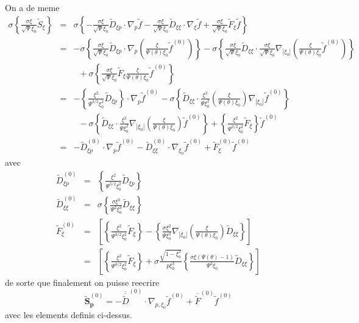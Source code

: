 On a de meme \begin{eqnarray*}
\sigma\left\{ \frac{\sigma\xi}{\sqrt{\Psi}\xi_{0}}\widetilde{S}_{\xi}\right\}  & = & \sigma\left\{ -\frac{\sigma\xi}{\sqrt{\Psi}\xi_{0}}\widetilde{D}_{\xi p}\cdot\nabla_{p}\widetilde{f}-\frac{\sigma\xi}{\sqrt{\Psi}\xi_{0}}\widetilde{D}_{\xi\xi}\cdot\nabla_{\xi}\widetilde{f}+\frac{\sigma\xi}{\sqrt{\Psi}\xi_{0}}\widetilde{F}_{\xi}\widetilde{f}\right\} \\
 & = & -\sigma\left\{ \frac{\sigma\xi}{\sqrt{\Psi}\xi_{0}}\widetilde{D}_{\xi p}\cdot\nabla_{p}\left(\frac{\xi}{\Psi(\theta)\xi_{0}}\widetilde{f}^{(0)}\right)\right\} -\sigma\left\{ \frac{\sigma\xi}{\sqrt{\Psi}\xi_{0}}\widetilde{D}_{\xi\xi}\cdot\frac{\sigma\xi}{\sqrt{\Psi}\xi_{0}}\nabla_{\left|\xi_{0}\right|}\left(\frac{\xi}{\Psi(\theta)\xi_{0}}\widetilde{f}^{(0)}\right)\right\} \\
 &  & \;\;+\sigma\left\{ \frac{\sigma\xi}{\sqrt{\Psi}\xi_{0}}\widetilde{F}_{\xi}\frac{\xi}{\Psi(\theta)\xi_{0}}\widetilde{f}^{(0)}\right\} \\
 & = & -\left\{ \frac{\xi^{2}}{\Psi^{3/2}\xi_{0}^{2}}\widetilde{D}_{\xi p}\right\} \cdot\nabla_{p}\widetilde{f}^{(0)}-\sigma\left\{ \widetilde{D}_{\xi\xi}\cdot\frac{\xi^{2}}{\Psi\xi_{0}^{2}}\left(\frac{\xi}{\Psi(\theta)\xi_{0}}\right)\nabla_{\left|\xi_{0}\right|}\widetilde{f}^{(0)}\right\} \\
 &  & \;\;-\sigma\left\{ \widetilde{D}_{\xi\xi}\cdot\frac{\xi^{2}}{\Psi\xi_{0}^{2}}\nabla_{\left|\xi_{0}\right|}\left(\frac{\xi}{\Psi(\theta)\xi_{0}}\right)\widetilde{f}^{(0)}\right\} +\left\{ \frac{\xi^{2}}{\Psi^{3/2}\xi_{0}^{2}}\widetilde{F}_{\xi}\right\} \widetilde{f}^{(0)}\\
 & = & -\widetilde{D}_{\xi p}^{(0)}\cdot\nabla_{p}\widetilde{f}^{(0)}-\widetilde{D}_{\xi\xi}^{(0)}\cdot\nabla_{\xi_{0}}\widetilde{f}^{(0)}+\widetilde{F}_{\xi}^{(0)}\widetilde{f}^{(0)}\end{eqnarray*}
 avec \begin{eqnarray*}
\widetilde{D}_{\xi p}^{(0)} & = & \left\{ \frac{\xi^{2}}{\Psi^{3/2}\xi_{0}^{2}}\widetilde{D}_{\xi p}\right\} \\
\widetilde{D}_{\xi\xi}^{(0)} & = & \sigma\left\{ \frac{\sigma\xi^{3}}{\Psi^{2}\xi_{0}^{3}}\widetilde{D}_{\xi\xi}\right\} \\
\widetilde{F}_{\xi}^{(0)} & = & \left[\left\{ \frac{\xi^{2}}{\Psi^{3/2}\xi_{0}^{2}}\widetilde{F}_{\xi}\right\} -\left\{ \frac{\sigma\xi^{2}}{\Psi\xi_{0}^{2}}\nabla_{\left|\xi_{0}\right|}\left(\frac{\xi}{\Psi(\theta)\xi_{0}}\right)\widetilde{D}_{\xi\xi}\right\} \right]\\
 & = & \left[\left\{ \frac{\xi^{2}}{\Psi^{3/2}\xi_{0}^{2}}\widetilde{F}_{\xi}\right\} +\sigma\frac{\sqrt{1-\xi_{0}^{2}}}{p\xi_{0}^{3}}\left\{ \frac{\sigma\xi\left(\Psi(\theta)-1\right)}{\Psi^{2}\xi_{0}}\widetilde{D}_{\xi\xi}\right\} \right]\end{eqnarray*}
 de sorte que finalement on puisse reecrire \[
\widetilde{\mathbf{S}}_{\mathbf{p}}^{(0)}=-\overline{\overline{\widetilde{D}}}^{(0)}\cdot\nabla_{p,\xi_{0}}\widetilde{f}^{(0)}+\overline{\widetilde{F}}^{(0)}\widetilde{f}^{(0)}\]
 avec les elements definis ci-dessus.
